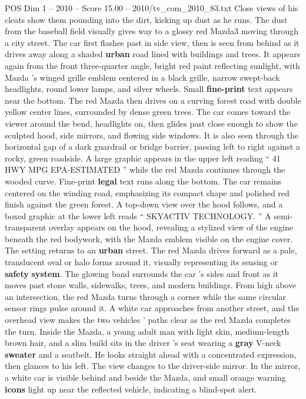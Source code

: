 \begin{textsample}{POS Dim 1 – 2010 – Score 15.00 – 2010/tv\_com\_2010\_83.txt}
Close views of his cleats show them pounding into the dirt, kicking up dust as he runs.
The dust from the baseball field visually gives way to a glossy red Mazda3 moving through a city street.
The car first flashes past in side view, then is seen from behind as it drives away along a shaded \textbf{urban} road lined with buildings and trees.
It appears again from the front three-quarter angle, bright red paint reflecting sunlight, with Mazda ’s winged grille emblem centered in a black grille, narrow swept-back headlights, round lower lamps, and silver wheels.
Small \textbf{fine-print} text appears near the bottom.
The red Mazda then drives on a curving forest road with double yellow center lines, surrounded by dense green trees.
The car comes toward the viewer around the bend, headlights on, then glides past close enough to show the sculpted hood, side mirrors, and flowing side windows.
It is also seen through the horizontal gap of a dark guardrail or bridge barrier, passing left to right against a rocky, green roadside.
A large graphic appears in the upper left reading “ 41 HWY MPG EPA-ESTIMATED ” while the red Mazda continues through the wooded curve.
Fine-print \textbf{legal} text runs along the bottom.
The car remains centered on the winding road, emphasizing its compact shape and polished red finish against the green forest.
A top-down view over the hood follows, and a boxed graphic at the lower left reads “ SKYACTIV TECHNOLOGY. ” A semi-transparent overlay appears on the hood, revealing a stylized view of the engine beneath the red bodywork, with the Mazda emblem visible on the engine cover.
The setting returns to an \textbf{urban} street.
The red Mazda drives forward as a pale, translucent oval or halo forms around it, visually representing its sensing or \textbf{safety} \textbf{system}.
The glowing band surrounds the car ’s sides and front as it moves past stone walls, sidewalks, trees, and modern buildings.
From high above an intersection, the red Mazda turns through a corner while the same circular sensor rings pulse around it.
A white car approaches from another street, and the overhead view makes the two vehicles ’ paths clear as the red Mazda completes the turn.
Inside the Mazda, a young adult man with light skin, medium-length brown hair, and a slim build sits in the driver ’s seat wearing a \textbf{gray} V-neck \textbf{sweater} and a seatbelt.
He looks straight ahead with a concentrated expression, then glances to his left.
The view changes to the driver-side mirror.
In the mirror, a white car is visible behind and beside the Mazda, and small orange warning \textbf{icons} light up near the reflected vehicle, indicating a blind-spot alert.

\end{textsample}
